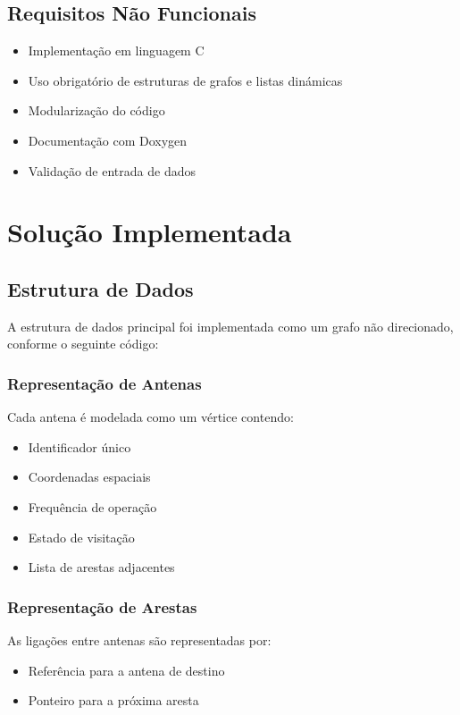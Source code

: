 \documentclass[a4paper, 12pt]{report}
\begin{document}
\newpage

\section{Requisitos Não Funcionais}
\begin{itemize}
\item Implementação em linguagem C
\item Uso obrigatório de estruturas de grafos e listas dinámicas
\item Modularização do código
\item Documentação com Doxygen
\item Validação de entrada de dados
\end{itemize}

\chapter{Solução Implementada}
\section{Estrutura de Dados}
A estrutura de dados principal foi implementada como um grafo não direcionado, conforme o seguinte código:

\subsection{Representação de Antenas}
Cada antena é modelada como um vértice contendo:
\begin{itemize}
\item Identificador único
\item Coordenadas espaciais
\item Frequência de operação
\item Estado de visitação
\item Lista de arestas adjacentes
\end{itemize}

\subsection{Representação de Arestas}
As ligações entre antenas são representadas por:
\begin{itemize}
\item Referência para a antena de destino
\item Ponteiro para a próxima aresta
\end{itemize}
\end{document}
